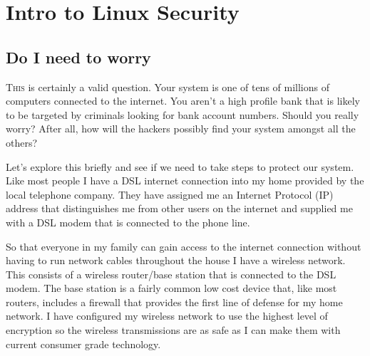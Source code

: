 

%

%

\section{{Intro to Linux Security}}
\label{sec:intro_to_linux_security}

\subsection{Do I need to worry}
\label{ssec:do_i_need_to_worry}

\lettrine[lines=3, findent=3pt, nindent=0pt]{T}{his} is certainly a valid
question. Your system is one of tens of millions of computers connected to the
internet. You aren’t a high profile bank that is likely to be targeted by
criminals looking for bank account numbers. Should you really worry? After all,
how will the hackers possibly find your system amongst all the others?



Let’s explore this briefly and see if we need to take steps to protect our
system. Like most people I have a DSL internet connection into my home provided
by the local telephone company. They have assigned me an Internet Protocol (IP)
address that distinguishes me from other users on the internet and supplied me
with a DSL modem that is connected to the phone line.



So that everyone in my family can gain access to the internet connection without
having to run network cables throughout the house I have a wireless network.
This consists of a wireless router/base station that is connected to the DSL
modem. The base station is a fairly common low cost device that, like most
routers, includes a firewall that provides the first line of defense for my home
network. I have configured my wireless network to use the highest level of
encryption so the wireless transmissions are as safe as I can make them with
current consumer grade technology. 



